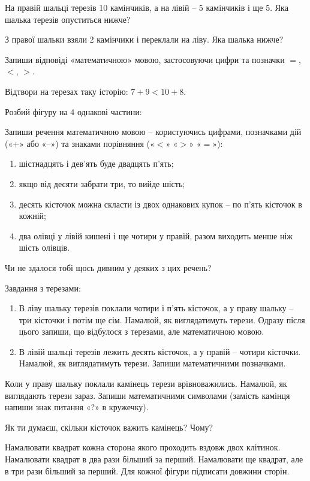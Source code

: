 \problem
На правій шальці терезів 10 камінчиків, а на лівій – 5 камінчиків і ще 5.
Яка шалька терезів опуститься нижче?

З правої шальки взяли 2 камінчики і переклали на ліву.
Яка шалька нижче?

Запиши відповіді «математичною» мовою, застосовуючи цифри
та позначки $=$, $<$, $>$.


\problem
Відтвори на терезах таку історію: $7+9 < 10+8$.


\problem
Розбий фігуру на 4 однакові частини:


\problem
Запиши речення математичною мовою – користуючись цифрами,
позначками дій («$+$» або «$–$») та знаками порівняння («$<$» «$>$» «$=$»):
\begin{enumerate}
    \item шістнадцять і дев'ять буде двадцять п'ять;
    \item якщо від десяти забрати три, то вийде шість;
    \item десять кісточок можна скласти із двох однакових купок – 
    по п'ять кісточок в кожній;
    \item два олівці у лівій кишені і ще чотири у правій,
    разом виходить менше ніж шість олівців.
\end{enumerate}
Чи не здалося тобі щось дивним у деяких з цих речень?

\problem
Завдання з терезами:
\begin{enumerate}
    \item В ліву шальку терезів поклали чотири і п'ять кісточок,
    а у праву шальку – три кісточки і потім ще сім.
    Намалюй, як виглядатимуть терези.
    Одразу після цього запиши, що відбулося з терезами,
    але математичною мовою.
    \item В лівій шальці терезів лежить десять кісточок,
    а у правій – чотири кісточки.
    Намалюй, як виглядатимуть терези. Запиши математичними позначками.
\end{enumerate}

Коли у праву шальку поклали камінець терези врівноважились.
Намалюй, як виглядають терези зараз.
Запиши математичними символами
(замість камінця напиши знак питання «?» в кружечку).

Як ти думаєш, скільки кісточок важить камінець? Чому?


\problem
Намалювати квадрат кожна сторона якого проходить вздовж двох клітинок.
Намалювати квадрат в два рази більший за перший.
Намалювати ще квадрат, але в три рази більший за перший.
Для кожної фігури підписати довжини сторін.


